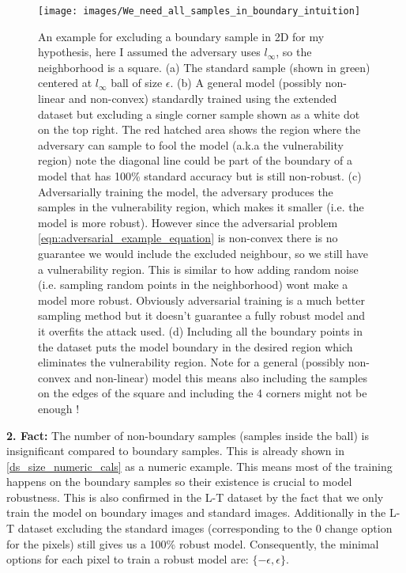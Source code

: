 \documentclass[../thesis.tex]{subfiles}
\begin{document}
	
	\begin{figure}[!h]
	\begin{minipage}{\textwidth}
		\centering
		\texttt{[image: images/We\_need\_all\_samples\_in\_boundary\_intuition]}
		\caption[short]{An example for excluding a boundary sample in 2D for my hypothesis, here I assumed the adversary uses $l_{\infty}$, so the neighborhood is a square. (a) The standard sample (shown in green) centered at $l_{\infty}$ ball of size $\epsilon$. (b) A general model (possibly non-linear and non-convex) standardly trained using the extended dataset but excluding a single corner sample shown as a white dot on the top right. The red hatched area shows the region where the adversary can sample to fool the model (a.k.a the vulnerability region) note the diagonal line could be part of the boundary of a model that has 100\% standard accuracy but is still non-robust. (c) Adversarially training the model, the adversary produces the samples in the vulnerability region, which makes it smaller (i.e. the model is more robust). However since the adversarial problem \ref{eqn:adversarial_example_equation} is non-convex there is no guarantee we would include the excluded neighbour, so we still have a vulnerability region. This is similar to how adding random noise (i.e. sampling random points in the neighborhood) wont make a model more robust. Obviously adversarial training is a much better sampling method but it doesn't guarantee a fully robust model and it overfits the attack used. (d) Including all the boundary points in the dataset puts the model boundary in the desired region which eliminates the vulnerability region. Note for a general (possibly non-convex and non-linear) model this means also including the samples on the edges of the square and including the 4 corners might not be enough !}
		\label{fig:weneedallsamplesinboundaryintuition}
	\end{minipage}
	\end{figure}
	
	
	\textbf{2. Fact:} The number of non-boundary samples (samples inside the ball) is insignificant compared to boundary samples. This is already shown in \ref{ds_size_numeric_cals} as a numeric example. This means most of the training happens on the boundary samples so their existence is crucial to model robustness. This is also confirmed in the L-T dataset by the fact that we only train the model on boundary images and standard images. Additionally in the L-T dataset excluding the standard images (corresponding to the 0 change option for the pixels) still gives us a 100\% robust model. Consequently, the minimal options for each pixel to train a robust model are: $\{ -\epsilon, \epsilon \}$.
	
\end{document}
